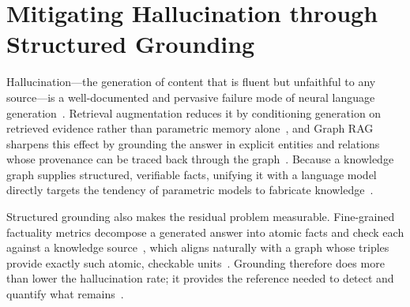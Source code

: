 \section{Mitigating Hallucination through Structured Grounding}
\label{sec:gr-hallucination}

Hallucination---the generation of content that is fluent but unfaithful to any
source---is a well-documented and pervasive failure mode of neural language
generation~\cite{ji2023hallucination}. Retrieval augmentation reduces it by
conditioning generation on retrieved evidence rather than parametric memory
alone~\cite{lewis2020rag, gao2023ragsurvey}, and Graph RAG sharpens this effect by
grounding the answer in explicit entities and relations whose provenance can be
traced back through the graph~\cite{peng2024graphrag}. Because a knowledge graph
supplies structured, verifiable facts, unifying it with a language model directly
targets the tendency of parametric models to fabricate
knowledge~\cite{pan2024unifying}.

Structured grounding also makes the residual problem measurable. Fine-grained
factuality metrics decompose a generated answer into atomic facts and check each
against a knowledge source~\cite{min2023factscore}, which aligns naturally with a
graph whose triples provide exactly such atomic, checkable
units~\cite{pan2024unifying}. Grounding therefore does more than lower the
hallucination rate; it provides the reference needed to detect and quantify what
remains~\cite{ji2023hallucination, min2023factscore}.
